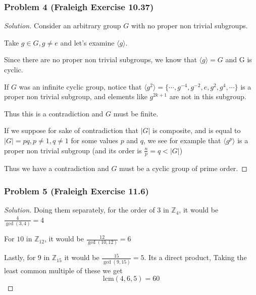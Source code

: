 \documentclass[11pt]{article}
\newcommand{\1}{\mathbf{1}}
\theoremstyle{definition}
\newenvironment{solution}{\begin{proof}[Solution]}{\end{proof}}
\begin{document}
\subsubsection*{Problem 4 (Fraleigh Exercise 10.37)}
\begin{solution}
    Consider an arbitrary group \(G\) with no proper non trivial subgroups.
    \par Take \(g \in G, g\ne e\) and let's examine \(\langle g\rangle \).
    \par Since there are no proper non trivial
    subgroups, we know that \(\langle g \rangle = G\) and G is cyclic.
 \par   If \(G\) was an infinite cyclic group, notice that \(\langle g^2\rangle = \{\cdots,
    g^{-4}, g^{-2}, e, g^{2}, g^{4}, \cdots \}\) is a proper non trivial subgroup, and
    elements like \(g^{2k+1}\) are not in this subgroup.
    \par  Thus this is a contradiction and \(G\) must be finite.
     \par If we suppose for sake of contradiction that \(|G|\) is composite, and is equal
     to \(|G| = pq, p \ne 1, q\ne 1\) for some values \(p\) and \(q\), we see for example that \(\langle
     g^{p}\rangle\) is a proper non trivial subgroup (and its order is \(\frac{n}{p} = q < |G|\))
     \par Thus we have a contradiction and \(G\) must be a cyclic group of prime order.
\end{solution}
\subsubsection*{Problem 5 (Fraleigh Exercise 11.6)}
\begin{solution}
    Doing them separately, for the order of \(3\) in \(\mathbb{Z}_4\), it would be
    \(\frac{4}{\gcd(3, 4)} = 4\) 
    \par For \(10\) in \(\mathbb{Z}_{12}\), it would be \(\frac{12}{\gcd(10,12)}=6\)
    \par Lastly, for \(9\) in \(\mathbb{Z}_{15}\) it would be \(\frac{15}{\gcd(9,15)} = 5.\)
    Its a direct product, Taking the least common multiple of these we get 
    \[\text{lcm}(4, 6, 5) = 60\]
\end{solution}
\end{document}
